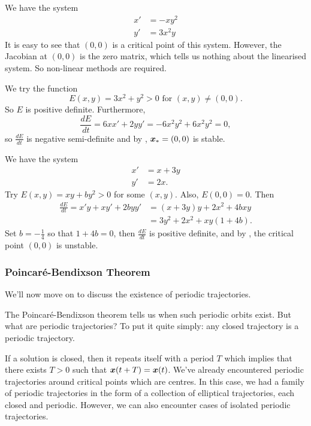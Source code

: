 \begin{eg}\label{eg:lyapunov2}
	We have the system
	\begin{align*}
		x' &= -xy^2 \\
		y' &= 3x^2y
	\end{align*}
	It is easy to see that $(0,0)$ is a critical point of this system. However, the Jacobian at $(0,0)$ is the zero matrix, which tells us nothing about the linearised system. So non-linear methods are required.
	
	We try the function
	\[
	E(x,y) = 3x^2 + y^2 > 0 \text{ for } (x,y) \neq (0,0).
	\]
	So $E$ is positive definite. Furthermore,
	\[
	\frac{dE}{dt} = 6xx' + 2yy' = -6x^2y^2 + 6x^2y^2 = 0,
	\]
	so $\frac{dE}{dt}$ is negative semi-definite and by , $\bm{x}_{\ast} = (0,0)$ is stable.
\end{eg}

\begin{eg}
	We have the system
	\begin{align*}
		x' &= x+3y \\
		y' &= 2x.
	\end{align*}
	Try $E(x,y) = xy + by^2 > 0$ for some $(x,y)$. Also, $E(0,0)=0$.	Then
	\begin{align*}
		\frac{dE}{dt} = x'y + xy' + 2byy' &= (x+3y)y + 2x^2 + 4bxy \\
		&= 3y^2 + 2x^2 + xy(1+4b).
	\end{align*}
	Set $b=-\frac14$ so that $1+4b=0$, then $\frac{dE}{dt}$ is positive definite, and by , the critical point $(0,0)$ is unstable.
\end{eg}

\subsubsection{Poincar\'{e}-Bendixson Theorem}

We'll now move on to discuss the existence of periodic trajectories. 

The Poincaré-Bendixson theorem tells us when such periodic orbits exist. But what are periodic trajectories? To put it quite simply: any closed trajectory is a periodic trajectory.

If a solution is closed, then it repeats itself with a period $T$ which implies that there exists $T>0$ such that $\bm{x}(t+T) = \bm{x}(t)$. 
We've already encountered periodic trajectories around critical points which are centres. In this case, we had a family of periodic trajectories in the form of a collection of elliptical trajectories, each closed and periodic. However, we can also encounter cases of isolated periodic trajectories.

